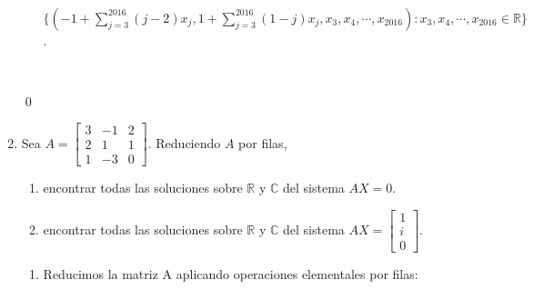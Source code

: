 \begin{enumerate}[topsep=6pt, itemsep=.4cm]
\begin{enumerate}
\

$\{ ( -1+\sum_{j=3}^{2016} (j-2) x_j , 1+\sum_{j=3}^{2016} (1-j) x_j , x_3 , x_4, \cdots, x_{2016}) : x_3,x_4,\cdots, x_{2016} \in \mathbb R \}$.

\

\end{enumerate}

\qed

     \item Sea $A=\begin{bmatrix}3 & -1 & 2 \\2 & 1 & 1 \\1&-3&0\end{bmatrix}$. Reduciendo $A$ por filas,
 \begin{enumerate}
   \item encontrar todas las soluciones sobre $\mathbb{R}$ y $\mathbb{C}$ del sistema $AX=0$.
   \item encontrar todas las soluciones sobre $\mathbb{R}$ y $\mathbb{C}$ del sistema $AX=\left[\begin{array}{c}
     1\\i\\0 \end{array}\right]$.
 \end{enumerate}

 \rta

\begin{enumerate}
\item Reducimos la matriz A aplicando operaciones elementales por filas:


\end{enumerate}
\end{enumerate}
